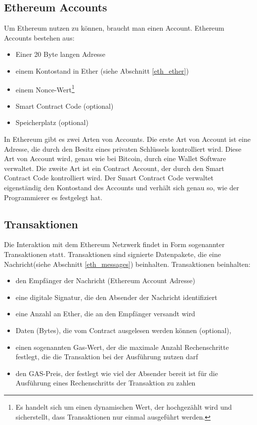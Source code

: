 \subsection{Ethereum Accounts}
Um Ethereum nutzen zu können, braucht man einen Account. Ethereum Accounts bestehen aus:\\
\begin{itemize}
\item Einer 20 Byte langen Adresse
\item einem Kontostand in Ether (siehe Abschnitt \ref{eth_ether})
\item einem Nonce-Wert\footnote{Es handelt sich um einen dynamischen Wert, der hochgezählt wird und sicherstellt, dass Transaktionen nur einmal ausgeführt werden.}
\item Smart Contract Code (optional)
\item Speicherplatz (optional)
\end{itemize} In Ethereum gibt es zwei Arten von Accounts. Die erste Art von Account ist eine Adresse, die durch den Besitz eines privaten Schlüssels kontrolliert wird. Diese Art von Account wird, genau wie bei Bitcoin, durch eine Wallet Software verwaltet. Die zweite Art ist ein  Contract Account, der durch den Smart Contract Code kontrolliert wird. Der Smart Contract Code verwaltet eigenständig den Kontostand des Accounts und verhält sich genau so, wie der Programmierer es festgelegt hat.

\subsection{Transaktionen}
Die Interaktion mit dem Ethereum Netzwerk findet in Form sogenannter Transaktionen statt. Transaktionen sind signierte Datenpakete, die eine Nachricht(siehe Abschnitt \ref{eth_messages}) beinhalten. Transaktionen beinhalten:
\begin{itemize}
\item den Empfänger der Nachricht (Ethereum Account Adresse)
\item eine digitale Signatur, die den Absender der Nachricht identifiziert
\item eine Anzahl an Ether, die an den Empfänger versandt wird
\item Daten (Bytes), die vom Contract ausgelesen werden können (optional),
\item einen sogenannten Gas-Wert, der die maximale Anzahl Rechenschritte festlegt, die die Transaktion bei der Ausführung nutzen darf
\item den GAS-Preis, der festlegt wie viel der Absender bereit ist für die Ausführung eines Rechenschritts der Transaktion zu zahlen
\end{itemize}


